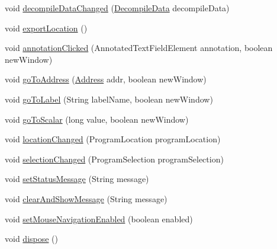 \begin{DoxyCompactItemize}
\item 
void \mbox{\hyperlink{classghidra_1_1app_1_1decompiler_1_1component_1_1_c_display_panel_a8c898c24d701d88232c06d4124523790}{decompile\+Data\+Changed}} (\mbox{\hyperlink{classghidra_1_1app_1_1decompiler_1_1component_1_1_decompile_data}{Decompile\+Data}} decompile\+Data)
\item 
void \mbox{\hyperlink{classghidra_1_1app_1_1decompiler_1_1component_1_1_c_display_panel_a68f0f8269debc8cc3aa8dd048dc42785}{export\+Location}} ()
\item 
void \mbox{\hyperlink{classghidra_1_1app_1_1decompiler_1_1component_1_1_c_display_panel_a8097a7e856b8595897a2709790ebd66f}{annotation\+Clicked}} (Annotated\+Text\+Field\+Element annotation, boolean new\+Window)
\item 
void \mbox{\hyperlink{classghidra_1_1app_1_1decompiler_1_1component_1_1_c_display_panel_aff38484bccab2cb48723394fd2f83486}{go\+To\+Address}} (\mbox{\hyperlink{class_address}{Address}} addr, boolean new\+Window)
\item 
void \mbox{\hyperlink{classghidra_1_1app_1_1decompiler_1_1component_1_1_c_display_panel_a42edf09645141abad7ba592cab6b2e50}{go\+To\+Label}} (String label\+Name, boolean new\+Window)
\item 
void \mbox{\hyperlink{classghidra_1_1app_1_1decompiler_1_1component_1_1_c_display_panel_a2f5663eed9340a3ff8cd5ece980d8bb2}{go\+To\+Scalar}} (long value, boolean new\+Window)
\item 
void \mbox{\hyperlink{classghidra_1_1app_1_1decompiler_1_1component_1_1_c_display_panel_a7f57fbf9d9615e6d475813776462beac}{location\+Changed}} (Program\+Location program\+Location)
\item 
void \mbox{\hyperlink{classghidra_1_1app_1_1decompiler_1_1component_1_1_c_display_panel_ad50cdae31ae05e417f812e5855f33d2f}{selection\+Changed}} (Program\+Selection program\+Selection)
\item 
void \mbox{\hyperlink{classghidra_1_1app_1_1decompiler_1_1component_1_1_c_display_panel_a3949006ba655114ced3a014bfb35ed45}{set\+Status\+Message}} (String message)
\item 
void \mbox{\hyperlink{classghidra_1_1app_1_1decompiler_1_1component_1_1_c_display_panel_a4e97fabe9ddab409c2008538a433c297}{clear\+And\+Show\+Message}} (String message)
\item 
void \mbox{\hyperlink{classghidra_1_1app_1_1decompiler_1_1component_1_1_c_display_panel_afe5766cd998ebfb262a39bdf7f5ce1c3}{set\+Mouse\+Navigation\+Enabled}} (boolean enabled)
\item 
void \mbox{\hyperlink{classghidra_1_1app_1_1decompiler_1_1component_1_1_c_display_panel_a41f19bb88aed7b6a4714a2ea905c2648}{dispose}} ()
\end{DoxyCompactItemize}


